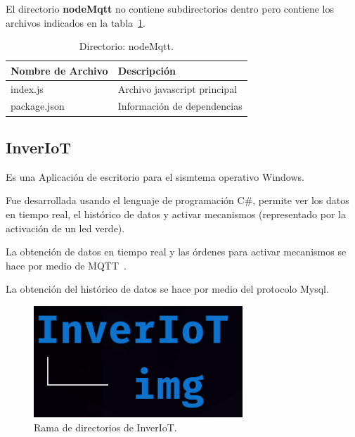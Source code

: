 El directorio \textbf{nodeMqtt} no contiene subdirectorios dentro pero contiene los archivos indicados en la tabla~\ref{tabla:directorioNodeMqtt}.


\begin{table}[htbp]
\begin{center}
\caption{Directorio: nodeMqtt.}
\begin{tabular}{|l|l|} %
\hline
\rowcolor[HTML]{C0C0C0} 
\textbf{Nombre de Archivo} & \textbf{Descripción}\\ \hline
index.js & Archivo javascript principal\\ \hline
package.json & Información de dependencias\\ \hline
\end{tabular}
\label{tabla:directorioNodeMqtt}
\end{center}
\end{table}

\subsection{InverIoT}
Es una Aplicación de escritorio para el sismtema operativo Windows.

Fue desarrollada usando el lenguaje de programación C\#, permite ver los datos en tiempo real, el histórico de datos y activar mecanismos (representado por la activación de un led verde).

La obtención de datos en tiempo real y las órdenes para activar mecanismos se hace por medio de MQTT~\cite{manual:MQTT}.

La obtención del histórico de datos se hace por medio del protocolo Mysql.

\begin{figure}[h]
\centering
\includegraphics[width=0.7\textwidth]{img/diagramas/directorios_InverIoT.png}
\caption{Rama de directorios de InverIoT.}
\end{figure}

